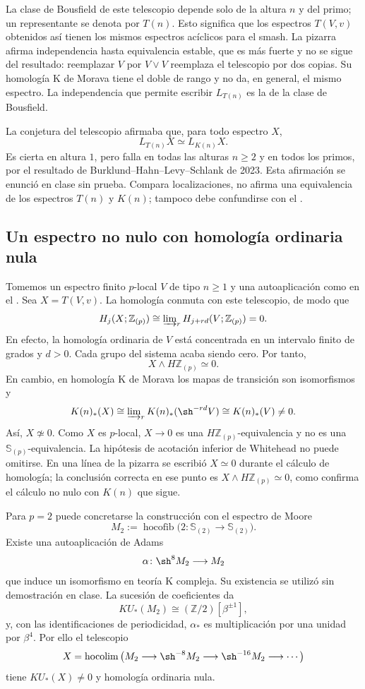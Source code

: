 La clase de Bousfield de este telescopio depende solo de la altura $n$ y del primo; un representante se denota por $T(n)$. Esto significa que los espectros $T(V,v)$ obtenidos así tienen los mismos espectros acíclicos para el smash. La pizarra afirma independencia hasta equivalencia estable, que es más fuerte y no se sigue del resultado: reemplazar $V$ por $V\vee V$ reemplaza el telescopio por dos copias. Su homología K de Morava tiene el doble de rango y no da, en general, el mismo espectro. La independencia que permite escribir $L_{T(n)}$ es la de la clase de Bousfield.

La conjetura del telescopio afirmaba que, para todo espectro $X$,
\[
L_{T(n)}X\simeq L_{K(n)}X.
\]
Es cierta en altura $1$, pero falla en todas las alturas $n\geq2$ y en todos los primos, por el resultado de Burklund--Hahn--Levy--Schlank de 2023. Esta afirmación se enunció en clase sin prueba. Compara localizaciones, no afirma una equivalencia de los espectros $T(n)$ y $K(n)$; tampoco debe confundirse con el .

\subsection{Un espectro no nulo con homología ordinaria nula}
Tomemos un espectro finito $p$-local $V$ de tipo $n\geq1$ y una autoaplicación como en el . Sea $X=T(V,v)$. La homología conmuta con este telescopio, de modo que
\[
H_j(X;\mathbb Z_{(p)})
\cong\varinjlim\nolimits_r H_{j+rd}(V;\mathbb Z_{(p)})=0.
\]
En efecto, la homología ordinaria de $V$ está concentrada en un intervalo finito de grados y $d>0$. Cada grupo del sistema acaba siendo cero. Por tanto,
\[
X\wedge H\mathbb Z_{(p)}\simeq0.
\]
En cambio, en homología K de Morava los mapas de transición son isomorfismos y
\[
K(n)_*(X)
\cong\varinjlim\nolimits_r K(n)_*(\sh^{-rd}V)
\cong K(n)_*(V)\ne0.
\]
Así, $X\not\simeq0$. Como $X$ es $p$-local, $X\to0$ es una $H\mathbb Z_{(p)}$-equivalencia y no es una $\mathbb S_{(p)}$-equivalencia. La hipótesis de acotación inferior de Whitehead no puede omitirse. En una línea de la pizarra se escribió $X\simeq0$ durante el cálculo de homología; la conclusión correcta en ese punto es $X\wedge H\mathbb Z_{(p)}\simeq0$, como confirma el cálculo no nulo con $K(n)$ que sigue.

Para $p=2$ puede concretarse la construcción con el espectro de Moore
\[
M_2:=\operatorname{hocofib}\bigl(2\colon\mathbb S_{(2)}\to\mathbb S_{(2)}\bigr).
\]
Existe una autoaplicación de Adams
\[
\alpha\colon\sh^8M_2\longrightarrow M_2
\]
que induce un isomorfismo en teoría K compleja. Su existencia se utilizó sin demostración en clase. La sucesión de coeficientes da
\[
KU_*(M_2)\cong(\mathbb Z/2)[\beta^{\pm1}],
\]
y, con las identificaciones de periodicidad, $\alpha_*$ es multiplicación por una unidad por $\beta^4$. Por ello el telescopio
\[
X=\operatorname*{hocolim}\left(
M_2\longrightarrow\sh^{-8}M_2\longrightarrow\sh^{-16}M_2\longrightarrow\cdots\right)
\]
tiene $KU_*(X)\ne0$ y homología ordinaria nula.

